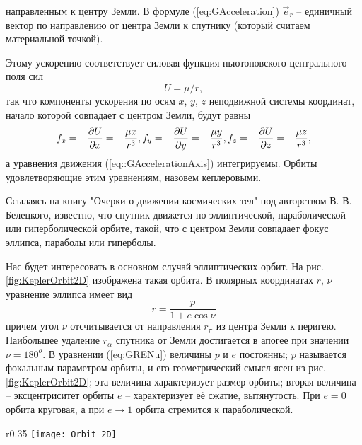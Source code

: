 направленным к центру Земли. В формуле (\ref{eq:GAcceleration}) $\vec{e}_r$ --
единичный вектор по направлению от центра Земли к спутнику (который считаем материальной точкой).\par
Этому ускорению соответствует силовая функция ньютоновского центрального поля сил
\begin{equation}
  U = \mu/r,
\end{equation}
так что компоненты ускорения по осям $x$, $y$, $z$ неподвижной системы координат,
начало которой совпадает с центром Земли, будут равны
\begin{equation} \label{eq::GAccelerationAxis}
  f_x = -\frac{\partial U}{\partial x} = - \frac{\mu x}{r^3}, \\
  f_y = -\frac{\partial U}{\partial y} = - \frac{\mu y}{r^3}, \\
  f_z = -\frac{\partial U}{\partial z} = - \frac{\mu z}{r^3},
\end{equation}
а уравнения движения (\ref{eq::GAccelerationAxis}) интегрируемы. Орбиты удовлетворяющие
этим уравнениям, назовем кеплеровыми.\par
Ссылаясь на книгу "Очерки о движении космических тел" под авторством В. В. Белецкого,
известно, что спутник движется по эллиптической, параболической или гиперболической орбите,
такой, что с центром Земли совпадает фокус эллипса, параболы или гиперболы.\par
Нас будет интересовать в основном случай эллиптических орбит. На рис. \ref{fig:KeplerOrbit2D}
изображена такая орбита. В полярных координатах $r$, $\nu$ уравнение эллипса имеет вид
\begin{equation} \label{eq:GRENu}
  r = \frac{p}{1 + e\cos\nu}
\end{equation}
причем угол $\nu$ отсчитывается от направления $r_{\pi}$ из центра Земли к перигею.
Наибольшее удаление $r_{\alpha}$ спутника от Земли достигается в апогее при значении
$\nu = 180^{o}$.
В уравнении (\ref{eq:GRENu}) величины $p$ и $e$ постоянны; $p$ называется
фокальным параметром орбиты, и его геометрический смысл ясен из рис. \ref{fig:KeplerOrbit2D};
эта величина характеризует размер орбиты; вторая величина -- эксцентриситет орбиты $e$ --
характеризует её сжатие, вытянутость.
При $e = 0$ орбита круговая, а при $e \rightarrow 1$
орбита стремится к параболической.
\begin{wrapfigure}{r}{0.35\textwidth}
  \centering
  \texttt{[image: Orbit\_2D]}
  \caption{Кеплерова эллиптическая орбита}
  \label{fig:KeplerOrbit2D}
\end{wrapfigure}
